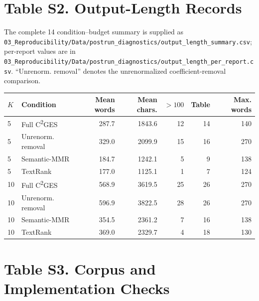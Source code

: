 \documentclass[11pt]{article}
\newcommand{\cges}{C\textsuperscript{2}GES}
\begin{document}
\section*{Table S2. Output-Length Records}

The complete 14 condition--budget summary is supplied as \nolinkurl{03_Reproducibility/Data/postrun_diagnostics/output_length_summary.csv}; per-report values are in \nolinkurl{03_Reproducibility/Data/postrun_diagnostics/output_length_per_report.csv}. ``Unrenorm. removal'' denotes the unrenormalized coefficient-removal comparison.

\begin{center}
\small
\begin{tabular}{llrrrrr}
\toprule
$K$ & Condition & Mean words & Mean chars. & $>100$ & Table & Max. words\\
\midrule
5 & Full \cges{} & 287.7 & 1843.6 & 12 & 14 & 140\\
5 & Unrenorm. removal & 329.0 & 2099.9 & 15 & 16 & 270\\
5 & Semantic-MMR & 184.7 & 1242.1 & 5 & 9 & 138\\
5 & TextRank & 177.0 & 1125.1 & 1 & 7 & 124\\
10 & Full \cges{} & 568.9 & 3619.5 & 25 & 26 & 270\\
10 & Unrenorm. removal & 596.9 & 3822.5 & 28 & 26 & 270\\
10 & Semantic-MMR & 354.5 & 2361.2 & 7 & 16 & 138\\
10 & TextRank & 369.0 & 2329.7 & 4 & 18 & 130\\
\bottomrule
\end{tabular}
\end{center}

\section*{Table S3. Corpus and Implementation Checks}
\end{document}
